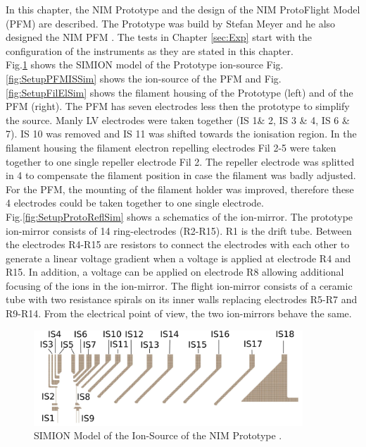 	In this chapter, the NIM Prototype and the design of the NIM ProtoFlight Model (PFM) are described. The Prototype was build by Stefan Meyer and he also designed the NIM PFM \cite{Diss_Meyer}. The tests in Chapter \ref{sec:Exp} start with the configuration of the instruments as they are stated in this chapter.\\
	Fig.\ref{fig:SetupProtoISSim} shows the SIMION model of the Prototype ion-source Fig.\ref{fig:SetupPFMISSim} shows the ion-source of the PFM and Fig.\ref{fig:SetupFilElSim} shows the filament housing of the Prototype (left) and of the PFM (right). The PFM has seven electrodes less then the prototype to simplify the source. Manly LV electrodes were taken together (IS 1\& 2, IS 3 \& 4, IS 6 \& 7). IS 10 was removed and IS 11 was shifted towards the ionisation region. In the filament housing the filament electron repelling electrodes Fil 2-5 were taken together to one single repeller electrode Fil 2. The repeller electrode was splitted in 4 to compensate the filament position in case the filament was badly adjusted. For the PFM, the mounting of the filament holder was improved, therefore these 4 electrodes could be taken together to one single electrode.\\
	Fig.\ref{fig:SetupProtoReflSim} shows a schematics of the ion-mirror. The prototype ion-mirror consists of 14 ring-electrodes (R2-R15). R1 is the drift tube. Between the electrodes R4-R15 are resistors to connect the electrodes with each other to generate a linear voltage gradient when a voltage is applied at electrode R4 and R15. In addition, a voltage can be applied on electrode R8 allowing additional focusing of the ions in the ion-mirror.	The flight ion-mirror consists of a ceramic tube with two resistance spirals on its inner walls replacing electrodes R5-R7 and R9-R14. From the electrical point of view, the two ion-mirrors behave the same.\\
	
		
		\begin{figure}[h]
			\centering
			\includegraphics[width= 0.9\textwidth]{Setup/Proto_IS_sim.png}
			\caption{SIMION Model of the Ion-Source of the NIM Prototype \cite{Diss_Meyer}.}
			\label{fig:SetupProtoISSim}
		\end{figure}
		
